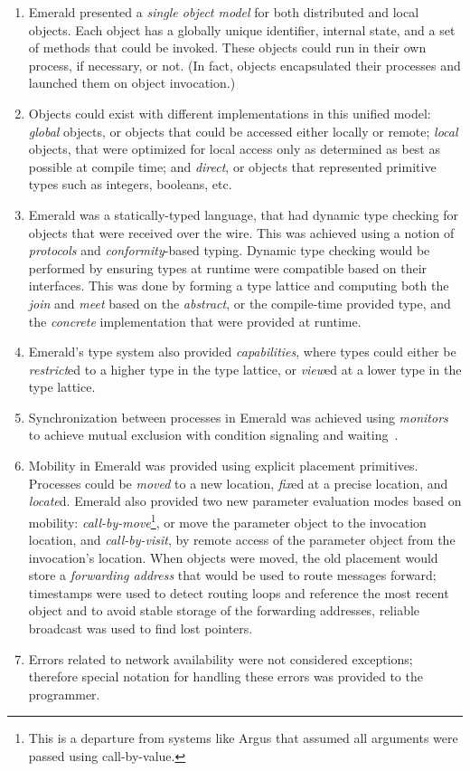 \begin{enumerate}
\item Emerald presented a \textit{single object model} for both distributed and local objects.  Each object has a globally unique identifier, internal state, and a set of methods that could be invoked.  These objects could run in their own process, if necessary, or not.  (In fact, objects encapsulated their processes and launched them on object invocation.)
\item Objects could exist with different implementations in this unified model: \textit{global} objects, or objects that could be accessed either locally or remote; \textit{local} objects, that were optimized for local access only as determined as best as possible at compile time; and \textit{direct}, or objects that represented primitive types such as integers, booleans, etc.
\item Emerald was a statically-typed language, that had dynamic type checking for objects that were received over the wire.  This was achieved using a notion of \textit{protocols} and \textit{conformity}-based typing.  Dynamic type checking would be performed by ensuring types at runtime were compatible based on their interfaces.  This was done by forming a type lattice and computing both the \textit{join} and \textit{meet} based on the \textit{abstract}, or the compile-time provided type, and the \textit{concrete} implementation that were provided at runtime.
\item Emerald's type system also provided \textit{capabilities}, where types could either be \textit{restrict}ed to a higher type in the type lattice, or \textit{view}ed at a lower type in the type lattice.
\item Synchronization between processes in Emerald was achieved using \textit{monitors} to achieve mutual exclusion with condition signaling and waiting~\cite{hoare1974monitors}.
\item Mobility in Emerald was provided using explicit placement primitives.  Processes could be \textit{moved} to a new location, \textit{fix}ed at a precise location, and \textit{locate}d.  Emerald also provided two new parameter evaluation modes based on mobility: \textit{call-by-move}\footnote{This is a departure from systems like Argus that assumed all arguments were passed using call-by-value.}, or move the parameter object to the invocation location, and \textit{call-by-visit}, by remote access of the parameter object from the invocation's location.  When objects were moved, the old placement would store a \textit{forwarding address} that would be used to route messages forward; timestamps were used to detect routing loops and reference the most recent object and to avoid stable storage of the forwarding addresses, reliable broadcast was used to find lost pointers.
\item Errors related to network availability were not considered exceptions; therefore special notation for handling these errors was provided to the programmer.
\end{enumerate}

